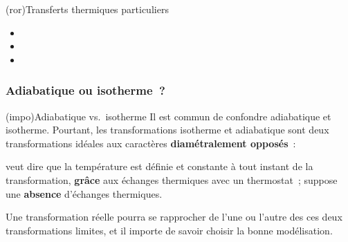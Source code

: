 \documentclass[../../main/main.tex]{subfiles}
\begin{document}
\begin{tcb*}(ror){Transferts thermiques particuliers}
	\begin{itemize}
		\item {}
		\item {}
		\item {}
	\end{itemize}
\end{tcb*}

\subsubsection{Adiabatique ou isotherme~?}

\begin{tcb*}(impo){Adiabatique vs.\ isotherme}
	Il est commun de confondre adiabatique et isotherme. Pourtant, les
	transformations isotherme et adiabatique sont deux transformations idéales aux
	caractères \textbf{diamétralement opposés}~:
	\begin{itemize}
		 veut dire que la température est définie et constante à
		tout instant de la transformation, \textbf{grâce} aux échanges thermiques
		avec un thermostat~;
		 suppose une \textbf{absence} d'échanges thermiques.
	\end{itemize}
\end{tcb*}
Une transformation réelle pourra se rapprocher de l'une ou l'autre des ces deux
transformations limites, et il importe de savoir choisir la bonne modélisation.
\end{document}
